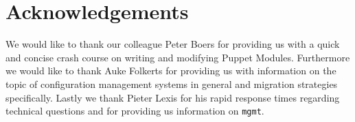 \thispagestyle{acknowledgements}
\section*{Acknowledgements}\label{sec:acknowledgements}
We would like to thank our colleague Peter Boers for providing us with a quick and concise crash course on writing and modifying Puppet Modules. Furthermore we would like to thank Auke Folkerts for providing us with information on the topic of configuration management systems in general and migration strategies specifically. Lastly we thank Pieter Lexis for his rapid response times regarding technical questions and for providing us information on \texttt{mgmt}.
